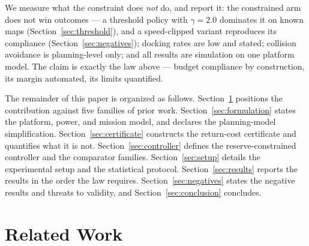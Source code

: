 \documentclass[preprint,12pt]{elsarticle}
\begin{document}
We measure what the constraint does \emph{not} do, and report it: the
constrained arm does not win outcomes --- a threshold policy with
$\gamma = 2.0$ dominates it on known maps (Section~\ref{sec:threshold}),
and a speed-clipped variant reproduces its compliance
(Section~\ref{sec:negatives}); docking rates are low and stated; collision
avoidance is planning-level only; and all results are simulation on one
platform model. The claim is exactly the law above --- budget compliance
by construction, its margin automated, its limits quantified.

The remainder of this paper is organized as follows.
Section~\ref{sec:related} positions the contribution against five
families of prior work. Section~\ref{sec:formulation} states the
platform, power, and mission model, and declares the planning-model
simplification. Section~\ref{sec:certificate} constructs the
return-cost certificate and quantifies what it is not.
Section~\ref{sec:controller} defines the reserve-constrained
controller and the comparator families. Section~\ref{sec:setup}
details the experimental setup and the statistical protocol.
Section~\ref{sec:results} reports the results in the order the law
requires. Section~\ref{sec:negatives} states the negative results
and threats to validity, and Section~\ref{sec:conclusion} concludes.

\section{Related Work}
\label{sec:related}
\end{document}
